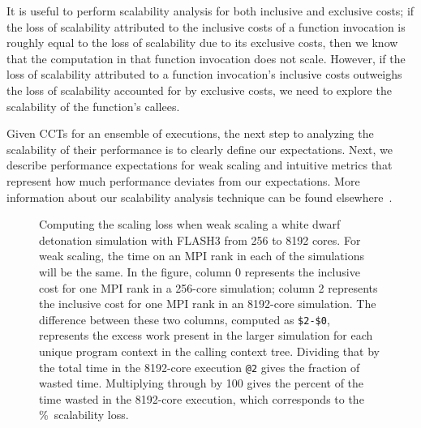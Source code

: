 \documentclass[11pt,letterpaper]{report}
\begin{document}
It is useful to perform scalability analysis for both inclusive and exclusive costs; if the loss of scalability attributed to the inclusive costs of a function invocation is roughly equal to the loss of scalability due to its exclusive costs, then we know that the computation in that function invocation does not scale.
However, if the loss of scalability attributed to a function invocation's inclusive costs outweighs the loss of scalability accounted for by exclusive costs, we need to explore the scalability of the function's callees.

Given CCTs for an ensemble of executions, the next step to analyzing the scalability of their performance is to clearly define our expectations.
Next, we describe performance expectations for weak scaling and intuitive metrics that represent how much performance deviates from our expectations.
More information about our scalability analysis technique can be found elsewhere~\cite{Coarfa-MC:2007:ICS-scalability,Tallent-MC-etal:2009:SC-hpctoolkit-petascale}.

\begin{figure}[t]
\caption{Computing the scaling loss when weak scaling a white dwarf detonation simulation with FLASH3  from 256 to 8192 cores. For weak scaling, the time on an MPI rank in each of the simulations will be the same. In the figure, column 0 represents the inclusive cost for one MPI rank in a 256-core simulation; column 2 represents the inclusive cost for one MPI rank in an 8192-core simulation.  The difference between these two columns, computed as {\tt \$2-\$0},
represents the excess work present in the larger simulation for each unique program context in the calling context tree. Dividing that by the total time in the 8192-core execution {\tt @2} gives the fraction of wasted  time. Multiplying through by 100 gives the percent of the time wasted in the 8192-core execution, which corresponds to the \%~scalability loss.}
\label{fig:scaling-loss}
\end{figure}
\end{document}
